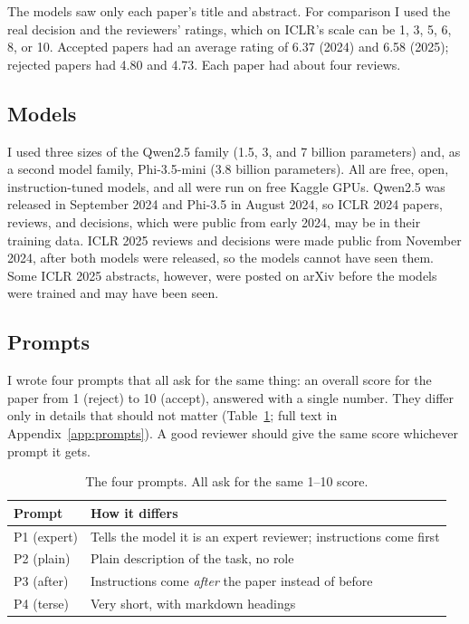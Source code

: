 \documentclass[11pt]{article}
\begin{document}
The models saw only each paper's title and abstract. For comparison I used the real decision and the reviewers' ratings, which on ICLR's scale can be 1, 3, 5, 6, 8, or 10. Accepted papers had an average rating of 6.37 (2024) and 6.58 (2025); rejected papers had 4.80 and 4.73. Each paper had about four reviews.

\subsection{Models}
I used three sizes of the Qwen2.5 family \citep{qwen2024qwen25} (1.5, 3, and 7 billion parameters) and, as a second model family, Phi-3.5-mini \citep{abdin2024phi3} (3.8 billion parameters). All are free, open, instruction-tuned models, and all were run on free Kaggle GPUs. Qwen2.5 was released in September 2024 and Phi-3.5 in August 2024, so ICLR 2024 papers, reviews, and decisions, which were public from early 2024, may be in their training data. ICLR 2025 reviews and decisions were made public from November 2024, after both models were released, so the models cannot have seen them. Some ICLR 2025 abstracts, however, were posted on arXiv before the models were trained and may have been seen.

\subsection{Prompts}
I wrote four prompts that all ask for the same thing: an overall score for the paper from 1 (reject) to 10 (accept), answered with a single number. They differ only in details that should not matter (Table~\ref{tab:prompts}; full text in Appendix~\ref{app:prompts}). A good reviewer should give the same score whichever prompt it gets.

\begin{table}[!htbp]
\centering
\begin{tabular}{ll}
\toprule
\textbf{Prompt} & \textbf{How it differs} \\
\midrule
P1 (expert) & Tells the model it is an expert reviewer; instructions come first \\
P2 (plain)  & Plain description of the task, no role \\
P3 (after)  & Instructions come \emph{after} the paper instead of before \\
P4 (terse)  & Very short, with markdown headings \\
\bottomrule
\end{tabular}
\caption{The four prompts. All ask for the same 1--10 score.}
\label{tab:prompts}
\end{table}
\end{document}
